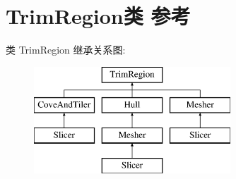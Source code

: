 \hypertarget{class_trim_region}{}\section{Trim\+Region类 参考}
\label{class_trim_region}
类 Trim\+Region 继承关系图\+:\begin{figure}[H]
\begin{center}
\leavevmode
\includegraphics[height=4.000000cm]{class_trim_region}
\end{center}
\end{figure}
